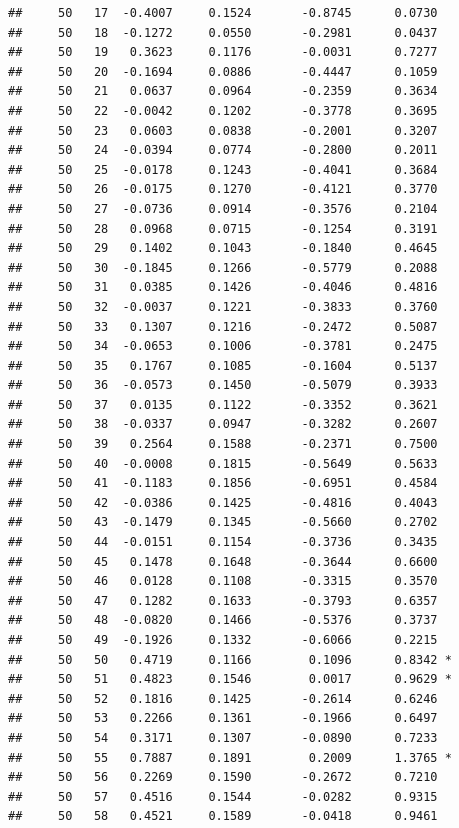 \documentclass[
]{article}
\begin{document}
\begin{verbatim}
##     50   17  -0.4007     0.1524       -0.8745      0.0730  
##     50   18  -0.1272     0.0550       -0.2981      0.0437  
##     50   19   0.3623     0.1176       -0.0031      0.7277  
##     50   20  -0.1694     0.0886       -0.4447      0.1059  
##     50   21   0.0637     0.0964       -0.2359      0.3634  
##     50   22  -0.0042     0.1202       -0.3778      0.3695  
##     50   23   0.0603     0.0838       -0.2001      0.3207  
##     50   24  -0.0394     0.0774       -0.2800      0.2011  
##     50   25  -0.0178     0.1243       -0.4041      0.3684  
##     50   26  -0.0175     0.1270       -0.4121      0.3770  
##     50   27  -0.0736     0.0914       -0.3576      0.2104  
##     50   28   0.0968     0.0715       -0.1254      0.3191  
##     50   29   0.1402     0.1043       -0.1840      0.4645  
##     50   30  -0.1845     0.1266       -0.5779      0.2088  
##     50   31   0.0385     0.1426       -0.4046      0.4816  
##     50   32  -0.0037     0.1221       -0.3833      0.3760  
##     50   33   0.1307     0.1216       -0.2472      0.5087  
##     50   34  -0.0653     0.1006       -0.3781      0.2475  
##     50   35   0.1767     0.1085       -0.1604      0.5137  
##     50   36  -0.0573     0.1450       -0.5079      0.3933  
##     50   37   0.0135     0.1122       -0.3352      0.3621  
##     50   38  -0.0337     0.0947       -0.3282      0.2607  
##     50   39   0.2564     0.1588       -0.2371      0.7500  
##     50   40  -0.0008     0.1815       -0.5649      0.5633  
##     50   41  -0.1183     0.1856       -0.6951      0.4584  
##     50   42  -0.0386     0.1425       -0.4816      0.4043  
##     50   43  -0.1479     0.1345       -0.5660      0.2702  
##     50   44  -0.0151     0.1154       -0.3736      0.3435  
##     50   45   0.1478     0.1648       -0.3644      0.6600  
##     50   46   0.0128     0.1108       -0.3315      0.3570  
##     50   47   0.1282     0.1633       -0.3793      0.6357  
##     50   48  -0.0820     0.1466       -0.5376      0.3737  
##     50   49  -0.1926     0.1332       -0.6066      0.2215  
##     50   50   0.4719     0.1166        0.1096      0.8342 *
##     50   51   0.4823     0.1546        0.0017      0.9629 *
##     50   52   0.1816     0.1425       -0.2614      0.6246  
##     50   53   0.2266     0.1361       -0.1966      0.6497  
##     50   54   0.3171     0.1307       -0.0890      0.7233  
##     50   55   0.7887     0.1891        0.2009      1.3765 *
##     50   56   0.2269     0.1590       -0.2672      0.7210  
##     50   57   0.4516     0.1544       -0.0282      0.9315  
##     50   58   0.4521     0.1589       -0.0418      0.9461  

\end{verbatim}
\end{document}

